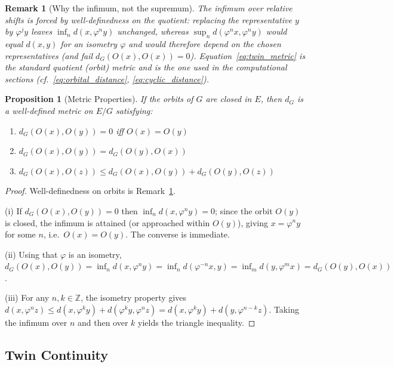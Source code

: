 \documentclass[11pt]{article}
\newtheorem{proposition}[theorem]{Proposition}
\newtheorem{remark}[theorem]{Remark}
\newcommand{\Z}{\mathbb{Z}}
\begin{document}
\begin{remark}[Why the infimum, not the supremum]\label{rem:inf_not_sup}
The infimum over relative shifts is forced by well-definedness on the quotient: replacing the representative $y$ by $\varphi^j y$ leaves $\inf_n d(x,\varphi^n y)$ unchanged, whereas $\sup_n d(\varphi^n x,\varphi^n y)$ would equal $d(x,y)$ for an isometry $\varphi$ and would therefore depend on the chosen representatives (and fail $d_G(O(x),O(x))=0$). Equation~\eqref{eq:twin_metric} is the standard quotient (orbit) metric and is the one used in the computational sections (cf.\ \eqref{eq:orbital_distance}, \eqref{eq:cyclic_distance}).
\end{remark}

\begin{proposition}[Metric Properties]\label{prop:metric}
If the orbits of $G$ are closed in $E$, then $d_G$ is a well-defined metric on $E/G$ satisfying:
\begin{enumerate}[label=(\roman*)]
\item $d_G(O(x), O(y)) = 0$ iff $O(x) = O(y)$
\item $d_G(O(x), O(y)) = d_G(O(y), O(x))$
\item $d_G(O(x), O(z)) \leq d_G(O(x), O(y)) + d_G(O(y), O(z))$
\end{enumerate}
\end{proposition}

\begin{proof}
Well-definedness on orbits is Remark~\ref{rem:inf_not_sup}.

(i) If $d_G(O(x),O(y))=0$ then $\inf_n d(x,\varphi^n y)=0$; since the orbit $O(y)$ is closed, the infimum is attained (or approached within $O(y)$), giving $x=\varphi^n y$ for some $n$, i.e.\ $O(x)=O(y)$. The converse is immediate.

(ii) Using that $\varphi$ is an isometry, $d_G(O(x),O(y))=\inf_n d(x,\varphi^n y)=\inf_n d(\varphi^{-n}x,y)=\inf_m d(y,\varphi^m x)=d_G(O(y),O(x))$.

(iii) For any $n,k\in\Z$, the isometry property gives $d(x,\varphi^n z)\le d(x,\varphi^k y)+d(\varphi^k y,\varphi^n z)=d(x,\varphi^k y)+d(y,\varphi^{n-k} z)$. Taking the infimum over $n$ and then over $k$ yields the triangle inequality.
\end{proof}

\subsection{Twin Continuity}
\end{document}
